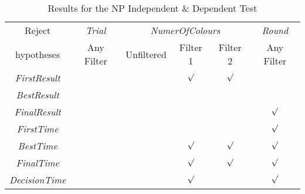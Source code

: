 \begin{table}[htbp]
  \centering
  \caption{Results for the NP Independent \& Dependent Test}
    \label{Results for the NP Test}
    \begin{tabular}{c|c|ccc|c}
    \toprule
       Reject   & \textit{Trial} & \multicolumn{3}{c|}{\textit{NumerOfColours}} & \textit{Round} \\
       hypotheses  & Any Filter & Unfiltered & Filter 1 & \multicolumn{1}{c|}{Filter 2} & Any Filter \\
    \midrule
	\textit{FirstResult} & &       & $\surd$     & $\surd$     &  \\
    \textit{BestResult} & &       &       &       &  \\
    \textit{FinalResult} & &       &       &       & $\surd$ \\
    \textit{FirstTime} & &       &       &       & $\surd$ \\
    \textit{BestTime} & &       & $\surd$     & $\surd$     & $\surd$ \\
    \textit{FinalTime} & &       & $\surd$     & $\surd$     & $\surd$ \\
    \textit{DecisionTime} & &       & $\surd$     &       & $\surd$ \\
    \bottomrule
    \end{tabular}%
  \label{NPTest}%
\end{table}%


